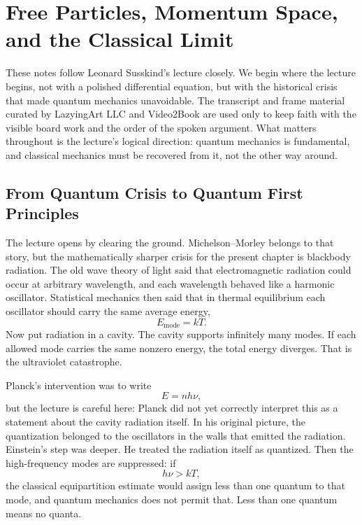 \chapter{Free Particles, Momentum Space, and the Classical Limit}

These notes follow Leonard Susskind's lecture closely. We begin where the lecture begins, not with a polished differential equation, but with the historical crisis that made quantum mechanics unavoidable. The transcript and frame material curated by LazyingArt LLC and Video2Book are used only to keep faith with the visible board work and the order of the spoken argument. What matters throughout is the lecture's logical direction: quantum mechanics is fundamental, and classical mechanics must be recovered from it, not the other way around.

\section{From Quantum Crisis to Quantum First Principles}

The lecture opens by clearing the ground. Michelson--Morley belongs to that story, but the mathematically sharper crisis for the present chapter is blackbody radiation. The old wave theory of light said that electromagnetic radiation could occur at arbitrary wavelength, and each wavelength behaved like a harmonic oscillator. Statistical mechanics then said that in thermal equilibrium each oscillator should carry the same average energy,
\begin{equation}
E_{\text{mode}} = kT.
\end{equation}
Now put radiation in a cavity. The cavity supports infinitely many modes. If each allowed mode carries the same nonzero energy, the total energy diverges. That is the ultraviolet catastrophe.

Planck's intervention was to write
\begin{equation}
E = n h \nu,
\end{equation}
but the lecture is careful here: Planck did not yet correctly interpret this as a statement about the cavity radiation itself. In his original picture, the quantization belonged to the oscillators in the walls that emitted the radiation. Einstein's step was deeper. He treated the radiation itself as quantized. Then the high-frequency modes are suppressed: if
\begin{equation}
h\nu > kT,
\end{equation}
the classical equipartition estimate would assign less than one quantum to that mode, and quantum mechanics does not permit that. Less than one quantum means no quanta.

